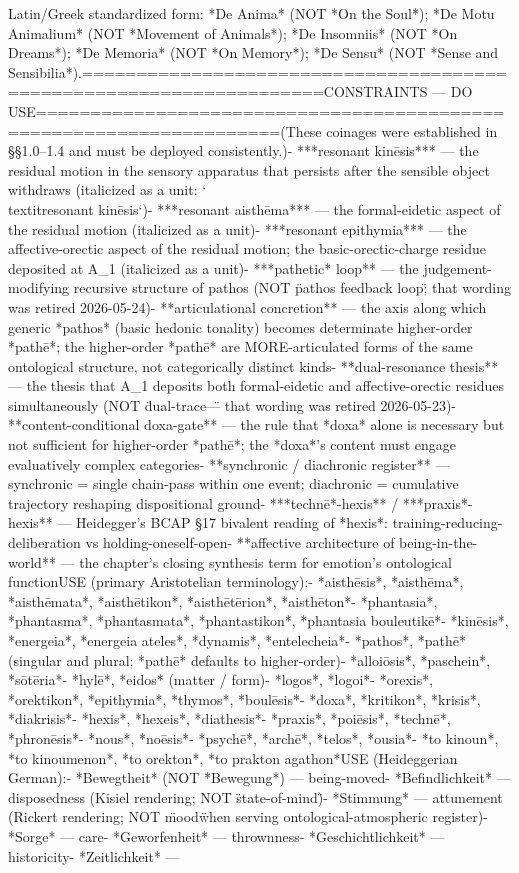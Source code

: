 {Latin/Greek standardized form: *De Anima* (NOT *On the Soul*); *De Motu Animalium* (NOT *Movement of Animals*); *De Insomniis* (NOT *On Dreams*); *De Memoria* (NOT *On Memory*); *De Sensu* (NOT *Sense and Sensibilia*).\n\n====================================================================\nVOCABULARY CONSTRAINTS — DO USE\n====================================================================\n\n(These coinages were established in §§1.0–1.4 and must be deployed consistently.)\n\n- ***resonant kinēsis*** — the residual motion in the sensory apparatus that persists after the sensible object withdraws (italicized as a unit: `\\textit{resonant kinēsis}`)\n- ***resonant aisthēma*** — the formal-eidetic aspect of the residual motion (italicized as a unit)\n- ***resonant epithymia*** — the affective-orectic aspect of the residual motion; the basic-orectic-charge residue deposited at A_1 (italicized as a unit)\n- ***pathetic* loop** — the judgement-modifying recursive structure of pathos (NOT \"pathos feedback loop\"; that wording was retired 2026-05-24)\n- **articulational concretion** — the axis along which generic *pathos* (basic hedonic tonality) becomes determinate higher-order *pathē*; the higher-order *pathē* are MORE-articulated forms of the same ontological structure, not categorically distinct kinds\n- **dual-resonance thesis** — the thesis that A_1 deposits both formal-eidetic and affective-orectic residues simultaneously (NOT \"dual-trace\" — that wording was retired 2026-05-23)\n- **content-conditional doxa-gate** — the rule that *doxa* alone is necessary but not sufficient for higher-order *pathē*; the *doxa*'s content must engage evaluatively complex categories\n- **synchronic / diachronic register** — synchronic = single chain-pass within one event; diachronic = cumulative trajectory reshaping dispositional ground\n- ***technē*-hexis** / ***praxis*-hexis** — Heidegger's BCAP §17 bivalent reading of *hexis*: training-reducing-deliberation vs holding-oneself-open\n- **affective architecture of being-in-the-world** — the chapter's closing synthesis term for emotion's ontological function\n\nDO USE (primary Aristotelian terminology):\n- *aisthēsis*, *aisthēma*, *aisthēmata*, *aisthētikon*, *aisthētērion*, *aisthēton*\n- *phantasia*, *phantasma*, *phantasmata*, *phantastikon*, *phantasia bouleutikē*\n- *kinēsis*, *energeia*, *energeia ateles*, *dynamis*, *entelecheia*\n- *pathos*, *pathē* (singular and plural; *pathē* defaults to higher-order)\n- *alloiōsis*, *paschein*, *sōtēria*\n- *hylē*, *eidos* (matter / form)\n- *logos*, *logoi*\n- *orexis*, *orektikon*, *epithymia*, *thymos*, *boulēsis*\n- *doxa*, *kritikon*, *krisis*, *diakrisis*\n- *hexis*, *hexeis*, *diathesis*\n- *praxis*, *poiēsis*, *technē*, *phronēsis*\n- *nous*, *noēsis*\n- *psychē*, *archē*, *telos*, *ousia*\n- *to kinoun*, *to kinoumenon*, *to orekton*, *to prakton agathon*\n\nDO USE (Heideggerian German):\n- *Bewegtheit* (NOT *Bewegung*) — being-moved\n- *Befindlichkeit* — disposedness (Kisiel rendering; NOT \"state-of-mind\")\n- *Stimmung* — attunement (Rickert rendering; NOT \"mood\" when serving ontological-atmospheric register)\n- *Sorge* — care\n- *Geworfenheit* — thrownness\n- *Geschichtlichkeit* — historicity\n- *Zeitlichkeit* — }
